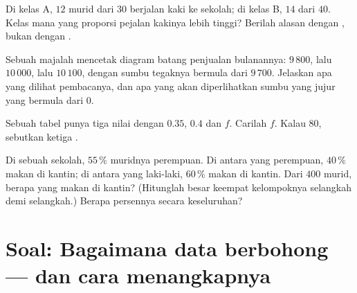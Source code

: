 \begin{exercise}[$\star\star$]\label{exo:g7:stats:8}
Di kelas A, $12$ murid dari $30$ berjalan kaki ke sekolah; di kelas B,
$14$ dari $40$. Kelas mana yang proporsi pejalan kakinya lebih tinggi?
Berilah alasan dengan , bukan dengan .
\end{exercise}

\begin{exercise}[$\star\star$]\label{exo:g7:stats:9}
Sebuah majalah mencetak diagram batang penjualan bulanannya:
$9\,800$, lalu $10\,000$, lalu $10\,100$, dengan sumbu tegaknya
bermula dari $9\,700$. Jelaskan apa yang dilihat pembacanya, dan apa
yang akan diperlihatkan sumbu yang jujur yang bermula dari $0$.
\end{exercise}

\begin{exercise}[$\star\star$]\label{exo:g7:stats:10}
Sebuah tabel  punya tiga nilai dengan  $0.35$, $0.4$ dan $f$. Carilah $f$. Kalau  
$80$, sebutkan ketiga .
\end{exercise}

\begin{exercise}[$\star\star\star$]\label{exo:g7:stats:11}
Di sebuah sekolah, $55\,\%$ muridnya perempuan. Di antara yang
perempuan, $40\,\%$ makan di kantin; di antara yang laki-laki,
$60\,\%$ makan di kantin. Dari $400$ murid, berapa yang makan di
kantin? (Hitunglah besar keempat kelompoknya selangkah demi
selangkah.) Berapa persennya secara keseluruhan?
\end{exercise}

\section{Soal: Bagaimana data berbohong --- dan cara menangkapnya}

